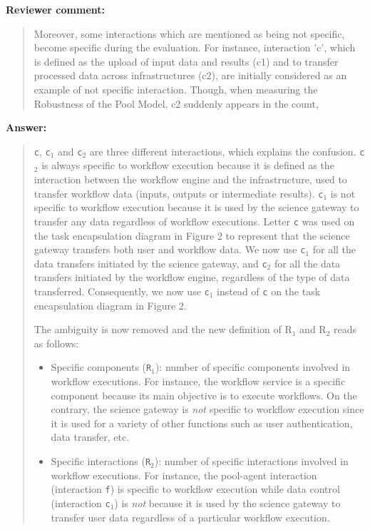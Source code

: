 \documentclass[a4]{article}
\newenvironment{review}%
{\textbf{Reviewer comment:}\begin{quote}}%
{\end{quote}}%
\newenvironment{answer}%
{\textbf{Answer:}\begin{small}\begin{quote}}%
{\end{quote}\end{small}}%
\newcommand{\revised}[1]{\color{blue} #1\color{black}}
\begin{document}
\begin{review}
Moreover, some
  interactions which are mentioned as being not specific, become
  specific during the evaluation. For instance, interaction 'c', which
  is defined as the upload of input data and results (c1) and to
  transfer processed data across infrastructures (c2), are initially
  considered as an example of not specific interaction. Though, when
  measuring the Robustness of the Pool Model, c2 suddenly appears in
  the count, 
\end{review}

\begin{answer}
\texttt{c}, \texttt{c$_1$} and \texttt{c$_2$} are three different
interactions, which explains the confusion. \texttt{c$_2$} is always
specific to workflow execution because it is defined as the
interaction between the workflow engine and the infrastructure, used
to transfer workflow data (inputs, outputs or intermediate
results). \texttt{c$_1$} is not specific to workflow execution because
it is used by the science gateway to transfer any data regardless of
workflow executions. Letter \texttt{c} was used on the task
encapsulation diagram in Figure 2 to represent that the science gateway transfers
both user and workflow data. We now use \texttt{c$_1$} for all the
data transfers initiated by the science gateway, and \texttt{c$_2$}
for all the data transfers initiated by the workflow engine,
regardless of the type of data transferred. Consequently, we now use
\texttt{c$_1$} instead of \texttt{c} on the task encapsulation diagram in Figure 2.

The ambiguity is now removed and the new definition of R$_1$ and R$_2$ reads as follows:

\begin{itemize}
\item Specific components (\texttt{R$_1$}): number of specific components involved in workflow executions. \revised{For instance, the
  workflow service is a specific component because its main objective
  is to execute workflows. On the contrary, the science gateway is
  \emph{not} specific to workflow execution since it is used for a
  variety of other functions such as user authentication, data
  transfer, etc.}
\item Specific interactions (\texttt{R$_2$}): number of specific
  interactions involved in workflow executions. \revised{For
    instance, the pool-agent interaction (interaction \texttt{f}) is
    specific to workflow execution while data control (interaction
    \texttt{c$_1$}) is \emph{not} because it is used by the science gateway to transfer
    user data regardless of a particular workflow execution}.
\end{itemize}
\end{answer}
\end{document}
